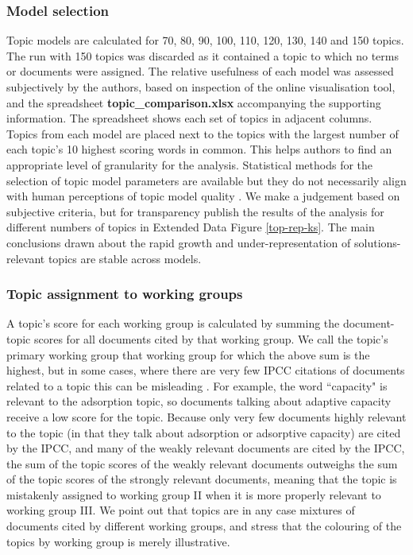\documentclass{article}
\begin{document}
\begin{linenumbers}
		\subsubsection*{Model selection}
		
		Topic models are calculated for 70, 80, 90, 100, 110, 120, 130, 140 and 150 topics. The run with 150 topics was discarded as it contained a topic to which no terms or documents were assigned. The relative usefulness of each model was assessed subjectively by the authors, based on inspection of the online visualisation tool, and the spreadsheet \textbf{topic\_comparison.xlsx} accompanying the supporting information. The spreadsheet shows each set of topics in adjacent columns. Topics from each model are placed next to the topics with the largest number of each topic's 10 highest scoring words in common. This helps authors to find an appropriate level of granularity for the analysis. Statistical methods for the selection of topic model parameters are available but they do not necessarily align with human perceptions of topic model quality \cite{Chang2009}. We make a judgement based on subjective criteria, but for transparency publish the results of the analysis for different numbers of topics in Extended Data Figure \ref{top-rep-ks}. The main conclusions drawn about the rapid growth and under-representation of solutions-relevant topics are stable across models.
		
		
		\subsubsection*{Topic assignment to working groups}
		\label{topic-wg}
		A topic's score for each working group is calculated by summing the document-topic scores for all documents cited by that working group. We call the topic's primary working group that working group for which the above sum is the highest, but in some cases, where there are very few IPCC citations of documents related to a topic this can be misleading . For example, the word ``capacity" is relevant to the adsorption topic, so documents talking about adaptive capacity receive a low score for the topic. Because only very few documents highly relevant to the topic (in that they talk about adsorption or adsorptive capacity) are cited by the IPCC, and many of the weakly relevant documents are cited by the IPCC, the sum of the topic scores of the weakly relevant documents outweighs the sum of the topic scores of the strongly relevant documents, meaning that the topic is mistakenly assigned to working group II when it is more properly relevant to working group III. We point out that topics are in any case mixtures of documents cited by different working groups, and stress that the colouring of the topics by working group is merely illustrative.
		

\end{linenumbers}
\end{document}
